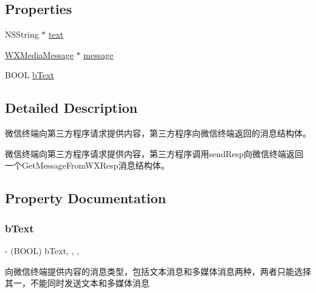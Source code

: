 \subsection*{Properties}
\begin{DoxyCompactItemize}
\item 
N\+S\+String $\ast$ \mbox{\hyperlink{interface_get_message_from_w_x_resp_a25c60eb5909d36838b598cff5324b51b}{text}}
\item 
\mbox{\hyperlink{interface_w_x_media_message}{W\+X\+Media\+Message}} $\ast$ \mbox{\hyperlink{interface_get_message_from_w_x_resp_a4f4c45c814e7b99aa95da23f183e19a3}{message}}
\item 
B\+O\+OL \mbox{\hyperlink{interface_get_message_from_w_x_resp_a563ef8ccb764762c8bb33ea7a05e6a85}{b\+Text}}
\end{DoxyCompactItemize}


\subsection{Detailed Description}
微信终端向第三方程序请求提供内容，第三方程序向微信终端返回的消息结构体。 

微信终端向第三方程序请求提供内容，第三方程序调用send\+Resp向微信终端返回一个\+Get\+Message\+From\+W\+X\+Resp消息结构体。 

\subsection{Property Documentation}
\mbox{\label{interface_get_message_from_w_x_resp_a563ef8ccb764762c8bb33ea7a05e6a85}} 
\subsubsection{\texorpdfstring{b\+Text}{bText}}
{\footnotesize\ttfamily -\/ (B\+O\+OL) b\+Text\hspace{0.3cm}{\ttfamily [read]}, {\ttfamily [write]}, {\ttfamily [nonatomic]}, {\ttfamily [assign]}}

向微信终端提供内容的消息类型，包括文本消息和多媒体消息两种，两者只能选择其一，不能同时发送文本和多媒体消息 \mbox{\label{interface_get_message_from_w_x_resp_a4f4c45c814e7b99aa95da23f183e19a3}} 
